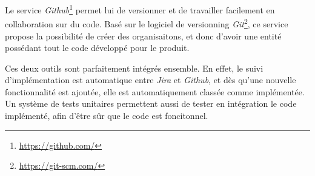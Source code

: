 		Le service \textit{Github}\footnote{\url{https://github.com/}} permet lui de versionner et de travailler facilement en collaboration sur du code. Basé sur le logiciel de versionning \textit{Git}\footnote{\url{https://git-scm.com/}}, ce service propose la possibilité de créer des organisaitons, et donc d'avoir une entité possédant tout le code développé pour le produit.
		
		Ces deux outils sont parfaitement intégrés ensemble. En effet, le suivi d'implémentation est automatique entre \textit{Jira} et \textit{Github}, et dès qu'une nouvelle fonctionnalité est ajoutée, elle est automatiquement classée comme implémentée. Un système de tests unitaires permettent aussi de tester en intégration le code implémenté, afin d'être sûr que le code est foncitonnel.